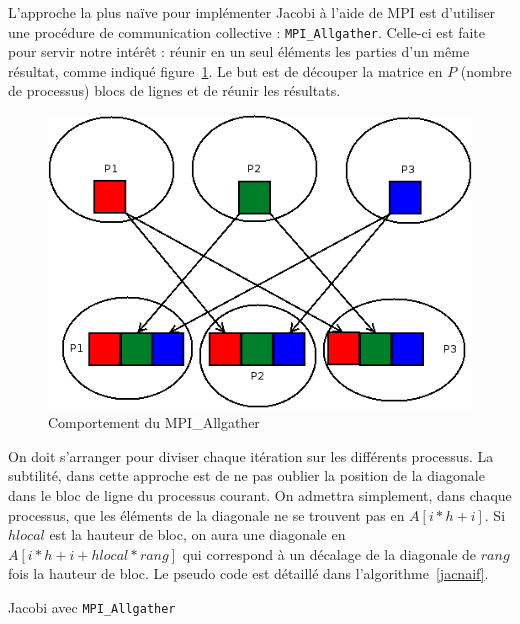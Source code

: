 \documentclass[a4paper]{article}
\begin{document}
L'approche la plus naïve pour implémenter Jacobi à l'aide de MPI est
d'utiliser une procédure de communication collective
: \texttt{MPI\_Allgather}. Celle-ci est faite pour servir notre
intérêt : réunir en un seul éléments les parties d'un même résultat,
comme indiqué figure~\ref{allgather}. Le but est de découper la
matrice en $P$ (nombre de processus) blocs de lignes et de réunir les
résultats.


\begin{figure}
\centering
\includegraphics[scale=0.4]{allgather.png}
\caption{\label{allgather}Comportement du MPI\_Allgather}
\end{figure}

On doit s'arranger pour diviser chaque itération sur les différents
processus. La subtilité, dans cette approche est de ne pas oublier la
position de la diagonale dans le bloc de ligne du processus courant.
On admettra simplement, dans chaque processus, que les éléments de la
diagonale ne se trouvent pas en $A[i * h + i] $. Si $hlocal$ est la
hauteur de bloc, on aura une diagonale en $A[i * h + i + hlocal *
rang]$ qui correspond à un décalage de la diagonale de $rang$ fois la
hauteur de bloc.
Le pseudo code est détaillé dans l'algorithme~\ref{jacnaif}.

\begin{algorithm}[H]
 \SetLine %
 
 \caption{\label{jacnaif}Jacobi avec \texttt{MPI\_Allgather}}
\end{algorithm}
\end{document}
